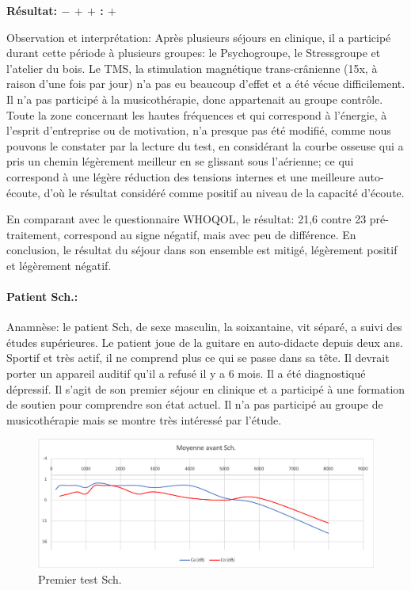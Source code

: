                 \textbf{ Résultat:  $- $  $+ $   $+ $     :   $+$}
                
                Observation et interprétation: Après plusieurs séjours en clinique, il a participé durant cette 
                période à plusieurs groupes: le 
                Psychogroupe, le Stressgroupe et l'atelier du bois. Le TMS, la stimulation  magnétique 
                trans-crânienne 
                (15x, à raison 
                d'une fois par jour) n'a pas eu beaucoup d'effet et a été vécue difficilement.
                Il n'a pas participé à la musicothérapie, donc appartenait au groupe contrôle. 
                Toute la zone concernant les hautes fréquences et  qui 
                correspond à l'énergie, à 
                l'esprit d'entreprise ou de motivation, n'a presque pas été modifié, comme nous pouvons le 
                constater  
                par la lecture du test, en considérant la courbe osseuse qui a pris un chemin légèrement 
                meilleur en se glissant sous l'aérienne;  ce qui correspond à une légère réduction des tensions 
                internes et une meilleure auto-écoute, d'où le résultat considéré comme positif au niveau de la 
                capacité d'écoute.
                
                En comparant avec le questionnaire WHOQOL, le résultat: 21,6 contre 23 pré-traitement, 
                correspond au signe  négatif, mais avec peu de différence.
                En conclusion, le résultat du séjour dans son ensemble est mitigé, légèrement positif et 
                légèrement 
                négatif.

\paragraph{Patient Sch.:}
Anamnèse: le patient Sch, de sexe masculin, la soixantaine, vit séparé, a suivi des études supérieures. Le 
patient joue de la guitare en auto-didacte depuis deux ans. Sportif et très actif, il ne 
comprend plus ce qui se passe dans sa tête. Il devrait porter un appareil auditif qu'il a refusé il y a 6 mois. 
Il a été diagnostiqué dépressif. Il s'agit 
de son premier séjour en clinique et  a participé à une formation de soutien pour comprendre son état 
actuel. Il n'a pas participé au groupe de musicothérapie mais se montre très intéressé par l'étude.
\begin{figure}[th]
\centering
\includegraphics[width=0.7\linewidth]{images/graphiques/schaff_pre.png}
\caption[Patient Sch. : 1° test]{Premier test Sch.}

\end{figure}


